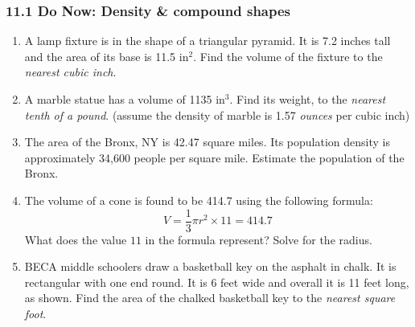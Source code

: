 \documentclass[12pt, twoside]{article}
\begin{document}
\subsubsection*{11.1 Do Now: Density \& compound shapes}
 \begin{enumerate}
  \item A lamp fixture is in the shape of a triangular pyramid. It is 7.2 inches tall and the area of its base is 11.5 in$^2$. Find the volume of the fixture to the \emph{nearest cubic inch}. \vspace{3cm}

  \item A marble statue has a volume of 1135 in$^3$. Find its weight, to the \emph{nearest tenth of a pound}. (assume the density of marble is 1.57 \emph{ounces} per cubic inch) \vspace{3cm}

  \item The area of the Bronx, NY is 42.47 square miles. Its population density is approximately 34,600 people per square mile. Estimate the population of the Bronx. \vspace{3cm}

  \item The volume of a cone is found to be 414.7 using the following formula:
    \[V=\frac{1}{3} \pi r^2 \times 11=414.7\]
    What does the value $11$ in the formula represent? Solve for the radius. \vspace{7cm}

\newpage
  \item BECA middle schoolers draw a basketball key on the asphalt in chalk. It is rectangular with one end round. It is 6 feet wide and overall it is 11 feet long, as shown. Find the area of the chalked basketball key to the \emph{nearest square foot}.\\[1.5cm]


\end{enumerate}
\end{document}
